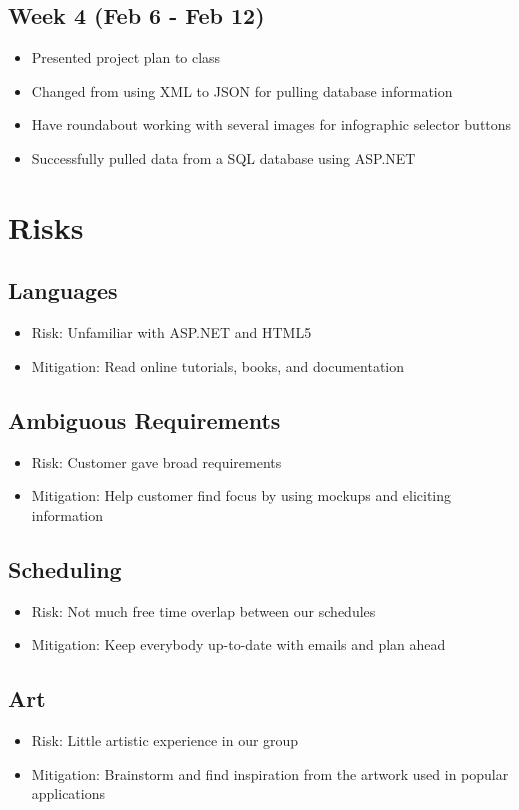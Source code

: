 \documentclass[11pt,a4paper,oneside]{article}
\begin{document}
\subsection{Week 4 (Feb 6 - Feb 12)}
\begin{itemize}
\item Presented project plan to class
\item Changed from using XML to JSON for pulling database information
\item Have roundabout working with several images for infographic selector buttons
\item Successfully pulled data from a SQL database using ASP.NET
\end{itemize}


\section{Risks}

\subsection{Languages}

\begin{itemize}
\item Risk: Unfamiliar with ASP.NET and HTML5 
\item Mitigation: Read online tutorials, books, and documentation
\end{itemize}


\subsection{Ambiguous Requirements}

\begin{itemize}
\item Risk: Customer gave broad requirements
\item Mitigation: Help customer find focus by using mockups and eliciting information
\end{itemize}


\subsection{Scheduling}

\begin{itemize}
\item Risk: Not much free time overlap between our schedules
\item Mitigation: Keep everybody up-to-date with emails and plan ahead
\end{itemize}


\subsection{Art}

\begin{itemize}
\item Risk: Little artistic experience in our group
\item Mitigation: Brainstorm and find inspiration from the artwork used in popular applications
\end{itemize}
\end{document}
